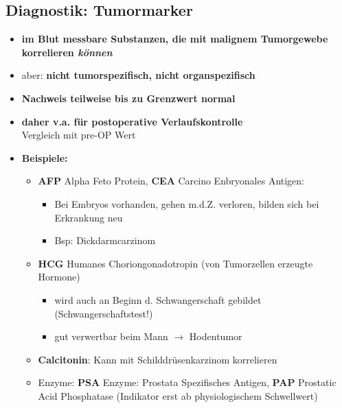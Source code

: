 	\subsection*{Diagnostik: Tumormarker}
		\begin{itemize}
			\item \textbf{im Blut messbare Substanzen, die mit malignem
				Tumorgewebe korrelieren \emph{können}}
			\item aber: \textbf{nicht tumorspezifisch, nicht organspezifisch}
			\item \textbf{Nachweis teilweise bis zu Grenzwert normal}
			\item \textbf{daher v.a. für postoperative Verlaufskontrolle}\\
				Vergleich mit pre-OP Wert
			\item \textbf{Beispiele:}
				\begin{itemize}
					\item \textbf{AFP} Alpha Feto Protein, \textbf{CEA} Carcino Enbryonales Antigen:
						\begin{itemize}
							\item Bei Embryos vorhanden, gehen m.d.Z. verloren, bilden sich bei Erkrankung neu
							\item Bsp: Dickdarmcarzinom
						\end{itemize}
					\item \textbf{HCG} Humanes Choriongonadotropin (von Tumorzellen erzeugte Hormone)
						\begin{itemize}
							\item wird auch an Beginn d. Schwangerschaft gebildet (Schwangerschaftstest!)
							\item gut verwertbar beim Mann $\rightarrow$ Hodentumor
						\end{itemize}
					\item \textbf{Calcitonin}: Kann mit Schilddrüsenkarzinom korrelieren
					\item Enzyme: \textbf{PSA} Enzyme: Prostata Spezifisches Antigen, \textbf{PAP} Prostatic Acid Phosphatase (Indikator erst ab physiologischem Schwellwert)
				\end{itemize}
		\end{itemize}